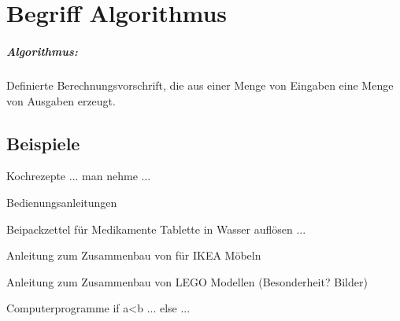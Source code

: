 \chapter{Begriff Algorithmus}
\paragraph{Algorithmus:} Definierte Berechnungsvorschrift, die aus einer Menge von Eingaben eine Menge von Ausgaben erzeugt.

\section{Beispiele}
\begin{compactitem}
	\item Kochrezepte {\flqq ... man nehme ...\frqq}
	\item Bedienungsanleitungen
	\item Beipackzettel für Medikamente {\flqq Tablette in Wasser auflösen ...\frqq}
	\item Anleitung zum Zusammenbau von für IKEA Möbeln
	\item Anleitung zum Zusammenbau von LEGO Modellen (Besonderheit? Bilder)
	\item Computerprogramme {\flqq if a<b ... else ...\frqq}
\end{compactitem}

